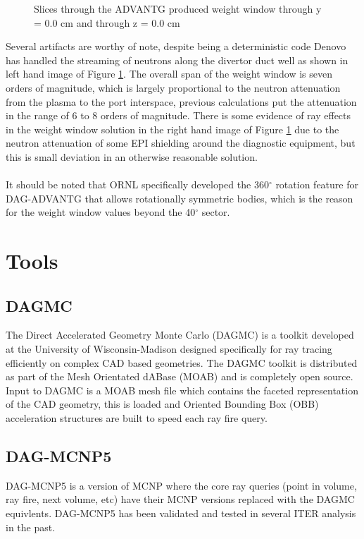 \documentclass[12pt]{article}
\begin{document}
\begin{figure}[ht!]
  \caption{Slices through the ADVANTG produced weight window through y = 0.0 cm and through z = 0.0 cm}
  \label{fig:wwinp}
\end{figure}
Several artifacts are worthy of note, despite being a deterministic code Denovo has handled the streaming of neutrons along the divertor duct well as shown in left hand image of Figure \ref{fig:wwinp}. The overall span of the weight window is seven orders of magnitude, which is largely proportional to the neutron attenuation from the plasma to the port interspace, previous calculations put the attenuation in the range of 6 to 8 orders of magnitude. There is some evidence of ray effects in the weight window solution in the right hand image of Figure \ref{fig:wwinp} due to the neutron attenuation of some EPI shielding around the diagnostic equipment, but this is small deviation in an otherwise reasonable solution.
\\
\\
It should be noted that ORNL specifically developed the 360$^{\circ}$ rotation feature for DAG-ADVANTG that allows rotationally symmetric bodies, which is the reason for the weight window values beyond the 40$^{\circ}$ sector.
\newpage
\section{Tools}
\subsection{DAGMC}
The Direct Accelerated Geometry Monte Carlo (DAGMC) is a toolkit developed at the University of Wisconsin-Madison designed specifically for ray tracing efficiently on complex CAD based geometries. The DAGMC toolkit is distributed as part of the Mesh Orientated dABase (MOAB) and is completely open source. Input to DAGMC is a MOAB mesh file which contains the faceted representation of the CAD geometry, this is loaded and Oriented Bounding Box (OBB) acceleration structures are built to speed each ray fire query.
\subsection{DAG-MCNP5}
DAG-MCNP5 \cite{dagmc} is a version of MCNP \cite{mcnp} where the core ray queries (point in volume, ray fire, next volume, etc) have their MCNP versions replaced with the DAGMC equivlents. DAG-MCNP5 has been validated \cite{dagmc_validation} and tested in several ITER analysis in the past.
\end{document}
